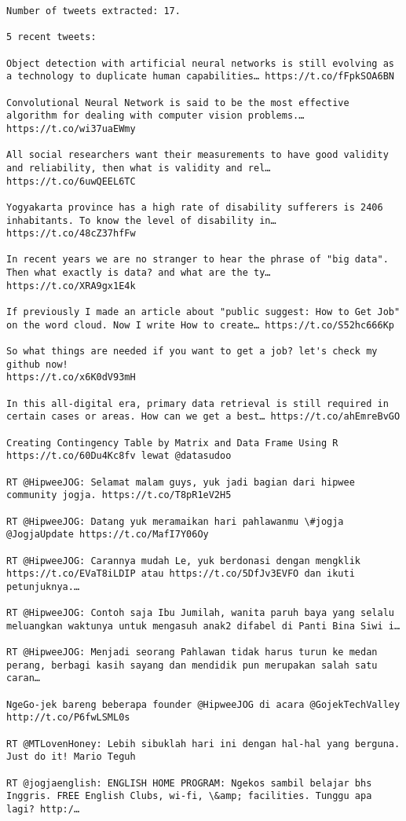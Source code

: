 \documentclass[11pt]{article}
\begin{document}
    \begin{Verbatim}[commandchars=\\\{\}]
Number of tweets extracted: 17.

5 recent tweets:

Object detection with artificial neural networks is still evolving as a technology to duplicate human capabilities… https://t.co/fFpkSOA6BN

Convolutional Neural Network is said to be the most effective algorithm for dealing with computer vision problems.… https://t.co/wi37uaEWmy

All social researchers want their measurements to have good validity and reliability, then what is validity and rel… https://t.co/6uwQEEL6TC

Yogyakarta province has a high rate of disability sufferers is 2406 inhabitants. To know the level of disability in… https://t.co/48cZ37hfFw

In recent years we are no stranger to hear the phrase of "big data". Then what exactly is data? and what are the ty… https://t.co/XRA9gx1E4k

If previously I made an article about "public suggest: How to Get Job" on the word cloud. Now I write How to create… https://t.co/S52hc666Kp

So what things are needed if you want to get a job? let's check my github now! 
https://t.co/x6K0dV93mH

In this all-digital era, primary data retrieval is still required in certain cases or areas. How can we get a best… https://t.co/ahEmreBvGO

Creating Contingency Table by Matrix and Data Frame Using R https://t.co/60Du4Kc8fv lewat @datasudoo

RT @HipweeJOG: Selamat malam guys, yuk jadi bagian dari hipwee community jogja. https://t.co/T8pR1eV2H5

RT @HipweeJOG: Datang yuk meramaikan hari pahlawanmu \#jogja @JogjaUpdate https://t.co/MafI7Y06Oy

RT @HipweeJOG: Carannya mudah Le, yuk berdonasi dengan mengklik https://t.co/EVaT8iLDIP atau https://t.co/5DfJv3EVFO dan ikuti petunjuknya.…

RT @HipweeJOG: Contoh saja Ibu Jumilah, wanita paruh baya yang selalu meluangkan waktunya untuk mengasuh anak2 difabel di Panti Bina Siwi i…

RT @HipweeJOG: Menjadi seorang Pahlawan tidak harus turun ke medan perang, berbagi kasih sayang dan mendidik pun merupakan salah satu caran…

NgeGo-jek bareng beberapa founder @HipweeJOG di acara @GojekTechValley http://t.co/P6fwLSML0s

RT @MTLovenHoney: Lebih sibuklah hari ini dengan hal-hal yang berguna. Just do it! Mario Teguh

RT @jogjaenglish: ENGLISH HOME PROGRAM: Ngekos sambil belajar bhs Inggris. FREE English Clubs, wi-fi, \&amp; facilities. Tunggu apa lagi? http:/…


    \end{Verbatim}
\end{document}
